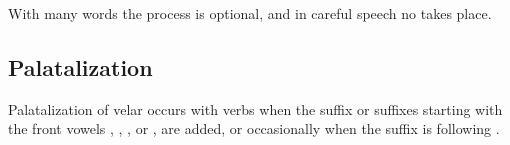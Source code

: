 With many words the process is optional, and in careful speech no  takes place.



\subsection{Palatalization}
\label{ssec:Palatalization}

Palatalization of velar  occurs with verbs when the  suffix  or suffixes starting with the front vowels  , , ,  or  ,  are added, or occasionally when the  suffix  is following .
%
